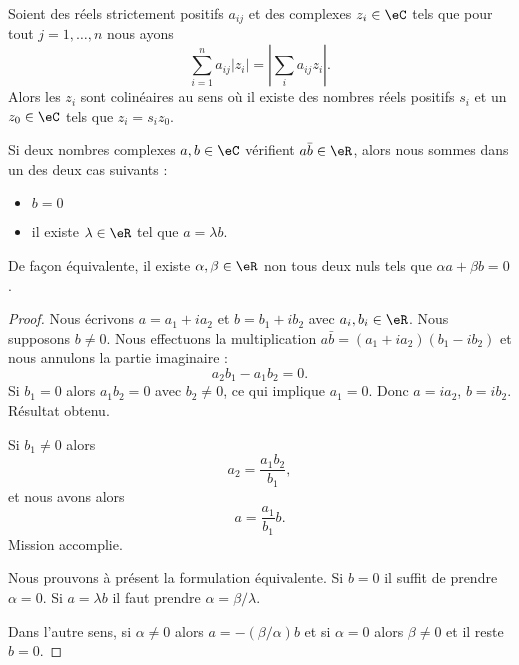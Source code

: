 \begin{lemma}       \label{LEMooNIXZooDxfpNM}
	Soient des réels strictement positifs \( a_{ij}\) et des complexes \( z_i\in \eC\) tels que pour tout \( j=1,\ldots, n\) nous ayons
	\begin{equation}
		\sum_{i=1}^na_{ij}| z_i |=| \sum_ia_{ij}z_i |.
	\end{equation}
	Alors les \( z_i\) sont colinéaires au sens où il existe des nombres réels positifs \( s_i\) et un \( z_0\in \eC\) tels que \( z_i=s_iz_0\).
\end{lemma}

\begin{lemma}       \label{LEMooXJBJooFDmhnV}
	Si deux nombres complexes \( a,b\in \eC\) vérifient \( a\bar b\in \eR\), alors nous sommes dans un des deux cas suivants :
	\begin{itemize}
		\item \( b=0\)
		\item il existe \( \lambda\in \eR\) tel que \( a=\lambda b\).
	\end{itemize}
	De façon équivalente, il existe \( \alpha,\beta\in \eR\) non tous deux nuls tels que \( \alpha a+\beta b=0\).
\end{lemma}

\begin{proof}
	Nous écrivons \( a=a_1+ia_2\) et \( b=b_1+ib_2\) avec \( a_i,b_i\in \eR\). Nous supposons \( b\neq 0\). Nous effectuons la multiplication \( a\bar b=(a_1+ia_2)(b_1-ib_2)\) et nous annulons la partie imaginaire :
	\begin{equation}
		a_2b_1-a_1b_2=0.
	\end{equation}
	Si \( b_1=0\) alors \( a_1b_2=0\) avec \( b_2\neq 0\), ce qui implique \( a_1=0\). Donc \( a=ia_2\), \( b=ib_2\). Résultat obtenu.

	Si \( b_1\neq 0\) alors
	\begin{equation}
		a_2=\frac{ a_1b_2 }{ b_1 },
	\end{equation}
	et nous avons alors
	\begin{equation}
		a=\frac{ a_1 }{ b_1 }b.
	\end{equation}
	Mission accomplie.

	Nous prouvons à présent la formulation équivalente. Si \( b=0\) il suffit de prendre \( \alpha=0\). Si \( a=\lambda b\) il faut prendre \( \alpha=\beta/\lambda\).

	Dans l'autre sens, si \( \alpha\neq 0\) alors \( a=-(\beta/\alpha)b\) et si \( \alpha=0\) alors \( \beta\neq 0\) et il reste \( b=0\).
\end{proof}

